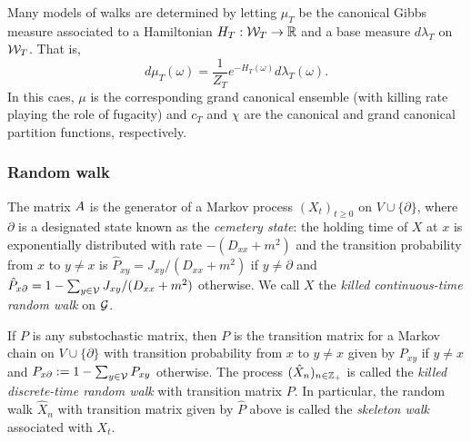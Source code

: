 Many models of walks are determined by letting $\mu_T$ be the canonical Gibbs measure
associated to a Hamiltonian $H_T : \mathcal{W}_T \rightarrow {\mathbb R}$ and a base measure $d\lambda_T$ on $\mathcal{W}_T$.
That is,
\begin{equation}
d\mu_T(\omega) = \frac{1}{Z_T} e^{-H_T(\omega)} d\lambda_T(\omega).
\end{equation}
In this caes, $\mu$ is the corresponding grand canonical ensemble (with killing rate playing
the role of fugacity) and $c_T$ and $\chi$
are the canonical and grand canonical partition functions, respectively.



\subsubsection{Random walk}


The matrix $A$ is the generator of a Markov process $(X_t)_{t \ge 0}$ on
$V \cup \{ \partial \}$, where $\partial$ is a designated state known as the
\emph{cemetery state}:
the holding time of $X$ at $x$ is exponentially distributed with rate $-(D_{xx} + m^2)$
and the transition probability from $x$ to $y \ne x$ is
$\hat P_{xy} = J_{xy} / (D_{xx} + m^2)$ if $y \ne \partial$
and $\hat P_{x\partial} = 1 - \sum_{y\in\mathcal{V}} J_{xy} / (D_{xx} + m^2)$
otherwise.
We call $X$ the \emph{killed continuous-time random walk} on $\mathcal{G}$.

If $P$ is any substochastic matrix, then $P$ is the transition matrix for a Markov chain
on $V \cup \{\partial\}$ with transition probability from $x$ to $y \ne x$ given by $P_{xy}$
if $y \ne x$ and $P_{x\partial} := 1 - \sum_{y\in\mathcal{V}} P_{xy}$ otherwise.
The process
$(\hat X_n)_{n\in{\mathbb Z}_+}$ is called the \emph{killed discrete-time random walk} with transition matrix $P$.
In particular, the random walk $\hat X_n$ with transition matrix given by $\hat P$ above
is called the \emph{skeleton walk} associated with $X_t$.


